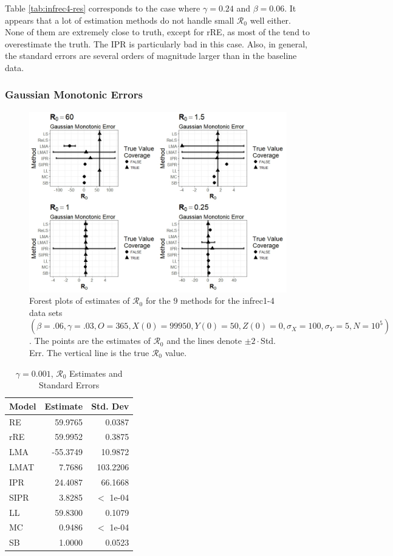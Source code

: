 \documentclass[12pt]{article}
\newcommand{\xxsir}{\ensuremath{9} } %
\newcommand{\rr}{\ensuremath{\mathcal{R}_0}}
\begin{document}
Table \ref{tab:infrec4-res} corresponds to the case where $\gamma = 0.24$ and $\beta=0.06$. It appears that a lot of estimation methods do not handle small $\rr$ well either. None of them are extremely close to truth, except for rRE, as most of the tend to overestimate the truth. The IPR is particularly bad in this case. Also, in general, the standard errors are several orders of magnitude larger than in the baseline data.

\subsubsection{Gaussian Monotonic Errors}

\begin{figure}[H]
	\centering
	\includegraphics[scale=0.5]{images/parchange_nm.jpeg}
	\caption{Forest plots of estimates of $\rr$ for the \xxsir methods for the infrec1-4 data sets $(\beta=.06, \gamma=.03, O=365, X(0)=99950, Y(0)=50, Z(0)=0, \sigma_X=100, \sigma_Y=5, N=10^5)$.  The points are the estimates of $\rr$ and the lines denote $\pm 2\cdot $Std. Err.  The vertical line is the true $\rr$ value.}
\end{figure}
\begin{table}[H]
	
	\centering
	\begin{tabular}[t]{l|r|r}
		\hline
		Model & Estimate & Std. Dev\\
		\hline
		RE & 59.9765 & 0.0387\\
		\hline
		rRE & 59.9952 & 0.3875\\
		\hline
		LMA & -55.3749 & 10.9872\\
		\hline
		LMAT & 7.7686 & 103.2206\\
		\hline
		IPR & 24.4087 & 66.1668\\
		\hline
		SIPR & 3.8285 & $<$ 1e-04\\
		\hline
		LL & 59.8300 & 0.1079\\
		\hline
		MC & 0.9486 & $<$ 1e-04\\
		\hline
		SB & 1.0000 & 0.0523\\
		\hline
	\end{tabular}
	\caption{$\gamma = 0.001$, $\rr$ Estimates and Standard Errors}
\end{table}
\end{document}
